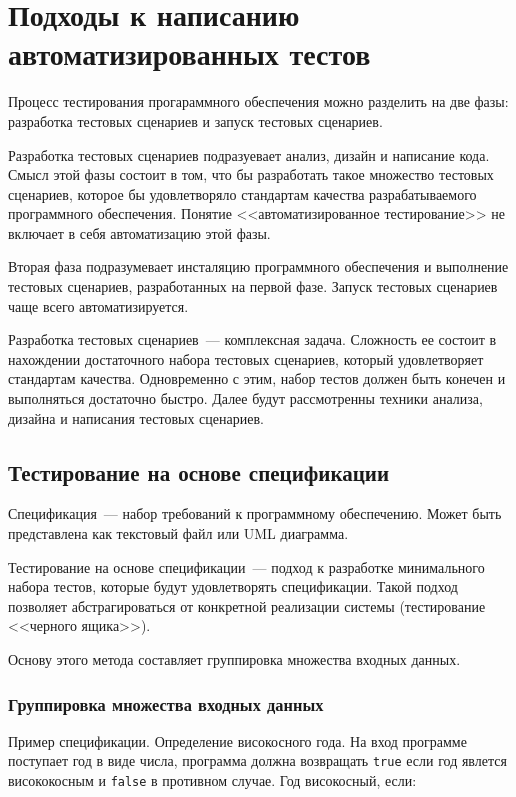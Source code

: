 \section{Подходы к написанию автоматизированных тестов} 

Процесс тестирования прогараммного обеспечения можно разделить на две фазы: разработка тестовых сценариев и запуск тестовых сценариев. 

Разработка тестовых сценариев подразуевает анализ, дизайн и написание кода. Смысл этой фазы состоит в том, что бы разработать такое множество тестовых сценариев, которое бы удовлетворяло стандартам качества разрабатываемого программного обеспечения. Понятие <<автоматизированное тестирование>> не включает в себя автоматизацию этой фазы.

Вторая фаза подразумевает инсталяцию программного обеспечения и выполнение тестовых сценариев, разработанных на первой фазе. Запуск тестовых сценариев чаще всего автоматизируется. 


Разработка тестовых сценариев~--- комплексная задача. Сложность ее состоит в нахождении достаточного набора тестовых сценариев, который удовлетворяет стандартам качества. Одновременно с этим, набор тестов должен быть конечен и выполняться достаточно быстро. Далее будут рассмотренны техники анализа, дизайна и написания тестовых сценариев.


\subsection{Тестирование на основе спецификации} 

Спецификация~--- набор требований к программному обеспечению. Может быть представлена как текстовый файл или UML диаграмма.

Тестирование на основе спецификации~--- подход к разработке минимального набора тестов, которые будут удовлетворять спецификации. Такой подход позволяет абстрагироваться от конкретной реализации системы (тестирование <<черного ящика>>).

Основу этого метода составляет группировка множества входных данных.

\subsubsection{Группировка множества входных данных}

Пример спецификации. Определение високосного года. На вход программе поступает год в виде числа, программа должна возвращать \texttt{true} если год явлется висококосным и \texttt{false} в противном случае. Год високосный, если:

